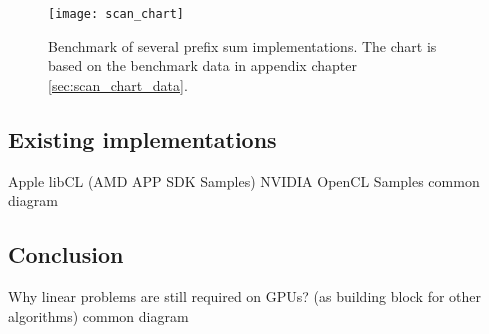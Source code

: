 

\begin{figure}
\centering
\texttt{[image: scan\_chart]}
\caption{Benchmark of several prefix sum implementations. The chart is based on the benchmark data in appendix chapter \ref{sec:scan_chart_data}.}
\label{fig:scan_chart}
\end{figure}

\subsection{Existing implementations}
Apple
libCL
(AMD APP SDK Samples)
NVIDIA OpenCL Samples
common diagram

\subsection{Conclusion}
Why linear problems are still required on GPUs? (as building block for other algorithms)
common diagram
